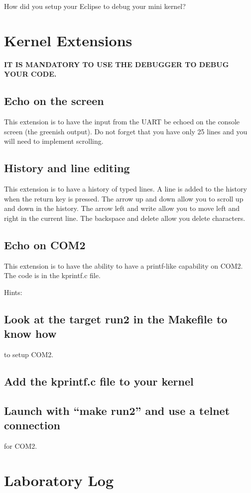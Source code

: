 \documentclass[10]{article}
\begin{document}
How did you setup your Eclipse to debug your mini kernel?

\section{Kernel Extensions}

{\bf IT IS MANDATORY TO USE THE DEBUGGER TO DEBUG YOUR CODE.}

\subsection{Echo on the screen}

This extension is to have the input from the UART be
echoed on the console screen (the greenish output).
Do not forget that you have only 25 lines and you will
need to implement scrolling.

\subsection{History and line editing}

This extension is to have a history of typed lines.
A line is added to the history when the return key is pressed.
The arrow up and down allow you to scroll up and down in the history.
The arrow left and write allow you to move left and right in the current line.
The backspace and delete allow you delete characters.

\subsection{Echo on COM2}

This extension is to have the ability to have a printf-like
capability on COM2. The code is in the kprintf.c file.

\noindent Hints:
\subsection{Look at the target run2 in the Makefile to know how}
to setup COM2.
\subsection{Add the kprintf.c file to your kernel}
\subsection{Launch with ``make run2'' and use a telnet connection}
for COM2.


\section{Laboratory Log}
\end{document}
